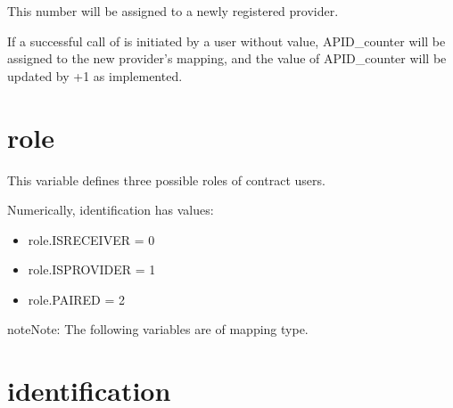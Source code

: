 \documentclass[letterpaper,10pt,english]{sphinxmanual}
\begin{document}
This number will be assigned to a newly registered provider.

If a successful call of {\hyperref[\detokenize{index:surprovider}]{}} is initiated by
a user without {\hyperref[\detokenize{index:apid}]{}} value,
APID\_counter will be assigned to the new provider’s {\hyperref[\detokenize{index:apid}]{}} mapping,
and the value of APID\_counter will be updated by +1 as {\hyperref[\detokenize{index:surprovider}]{}} implemented.


\section{role}
\label{\detokenize{index:role}}
%
\begin{sphinxVerbatim}[commandchars=\\\{\}]
    
\end{sphinxVerbatim}

This variable defines three possible roles of contract users.

Numerically, identification has values:
\begin{itemize}
\item {} 
role.ISRECEIVER = 0

\item {} 
role.ISPROVIDER = 1

\item {} 
role.PAIRED = 2

\end{itemize}

\begin{sphinxadmonition}{note}{Note:}
The following variables are of mapping type.

\end{sphinxadmonition}


\section{identification}
\label{\detokenize{index:identification}}
%
\begin{sphinxVerbatim}[commandchars=\\\{\}]
     
\end{sphinxVerbatim}
\end{document}
